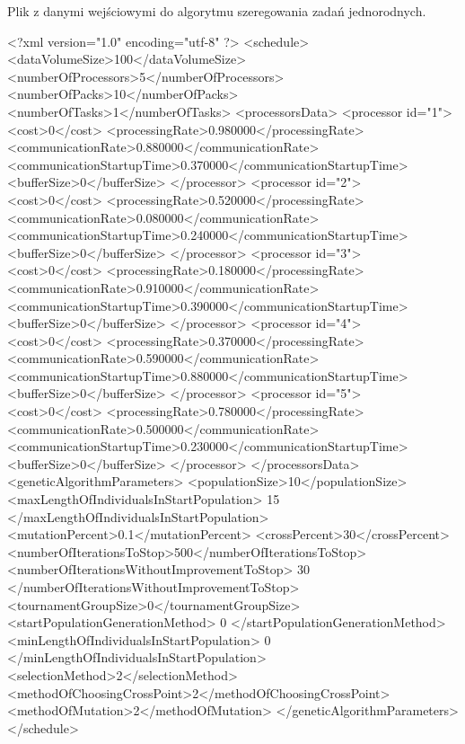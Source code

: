\clearpage
\begin{listing}
\caption{Plik z danymi wejściowymi do algorytmu szeregowania zadań jednorodnych.}\label{lst1}
\begin{codeblock}
<?xml version="1.0" encoding="utf-8" ?> 
<schedule>
<dataVolumeSize>100</dataVolumeSize>
<numberOfProcessors>5</numberOfProcessors>
<numberOfPacks>10</numberOfPacks>
<numberOfTasks>1</numberOfTasks>
<processorsData>
<processor id="1">
<cost>0</cost>
<processingRate>0.980000</processingRate>
<communicationRate>0.880000</communicationRate>
<communicationStartupTime>0.370000</communicationStartupTime>
<bufferSize>0</bufferSize>			
</processor>
<processor id="2">
<cost>0</cost>
<processingRate>0.520000</processingRate>
<communicationRate>0.080000</communicationRate>
<communicationStartupTime>0.240000</communicationStartupTime>
<bufferSize>0</bufferSize>			
</processor>
<processor id="3">
<cost>0</cost>
<processingRate>0.180000</processingRate>
<communicationRate>0.910000</communicationRate>
<communicationStartupTime>0.390000</communicationStartupTime>
<bufferSize>0</bufferSize>			
</processor>
<processor id="4">
<cost>0</cost>
<processingRate>0.370000</processingRate>
<communicationRate>0.590000</communicationRate>
<communicationStartupTime>0.880000</communicationStartupTime>
<bufferSize>0</bufferSize>			
</processor>
<processor id="5">
<cost>0</cost>
<processingRate>0.780000</processingRate>
<communicationRate>0.500000</communicationRate>
<communicationStartupTime>0.230000</communicationStartupTime>
<bufferSize>0</bufferSize>			
</processor>
</processorsData>
<geneticAlgorithmParameters>
<populationSize>10</populationSize>	
<maxLengthOfIndividualsInStartPopulation>
15
</maxLengthOfIndividualsInStartPopulation>
<mutationPercent>0.1</mutationPercent>
<crossPercent>30</crossPercent>
<numberOfIterationsToStop>500</numberOfIterationsToStop>
<numberOfIterationsWithoutImprovementToStop>
30
</numberOfIterationsWithoutImprovementToStop>
<tournamentGroupSize>0</tournamentGroupSize>
<startPopulationGenerationMethod>
0
</startPopulationGenerationMethod>
<minLengthOfIndividualsInStartPopulation>
0
</minLengthOfIndividualsInStartPopulation>
<selectionMethod>2</selectionMethod>
<methodOfChoosingCrossPoint>2</methodOfChoosingCrossPoint>
<methodOfMutation>2</methodOfMutation>
</geneticAlgorithmParameters>
</schedule>
\end{codeblock}
\end{listing}

